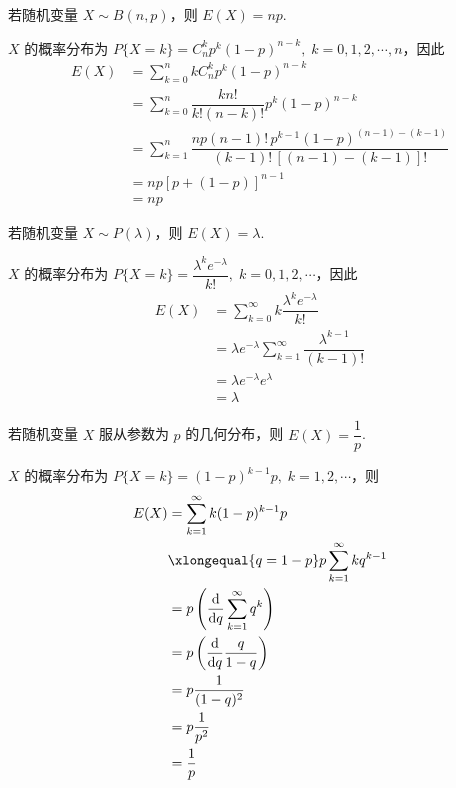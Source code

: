 \begin{conclusion}
    若随机变量 $X \sim B(n,p)$，则 $E(X) = np$.
\end{conclusion}

\begin{myproof}
    $X$ 的概率分布为 $P\{X=k\} = C_n^k p^k (1-p)^{n-k}, \; k=0,1,2,\cdots,n$，因此
    $$
    \begin{aligned}
        E(X) &= \sum_{k=0}^n k C_n^k p^k (1-p)^{n-k} \\
        &= \sum_{k=0}^n \dfrac{kn!}{k! (n-k)!} p^k (1-p)^{n-k} \\
        &= \sum_{k=1}^n \dfrac{np(n-1)! \, p^{k-1} (1-p)^{(n-1)-(k-1)}}{(k-1)! \, [(n-1)-(k-1)]!} \\
        &= np[p+(1-p)]^{n-1} \\
        &= np
    \end{aligned}
    $$
\end{myproof}

\begin{conclusion}
    若随机变量 $X \sim P(\lambda)$，则 $E(X) = \lambda$.
\end{conclusion}

\begin{myproof}
    $X$ 的概率分布为 $P\{X=k\} = \dfrac{\lambda^k e^{-\lambda}}{k!}, \; k=0,1,2,\cdots$，因此
    $$
    \begin{aligned}
        E(X) &= \sum_{k=0}^{\infty} k \dfrac{\lambda^k e^{-\lambda}}{k!} \\
        &= \lambda e^{-\lambda} \sum_{k=1}^{\infty} \dfrac{\lambda^{k-1}}{(k-1)!} \\
        &= \lambda e^{-\lambda} e^{\lambda} \\
        &= \lambda
    \end{aligned}
    $$
\end{myproof}

\begin{conclusion}
    若随机变量 $X$ 服从参数为 $p$ 的几何分布，则 $E(X) = \dfrac{1}{p}$.
\end{conclusion}

\begin{myproof}
    $X$ 的概率分布为 $P\{X=k\} = (1-p)^{k-1} p, \; k=1,2,\cdots$，则
    $$
    \begin{aligned}
        E(X) &= \sum_{k=1}^{\infty} k (1-p)^{k-1} p \\
        & \xlongequal{q=1-p} p \sum_{k=1}^{\infty} k q^{k-1} \\
        &= p \left( \dfrac{\text{d}}{\text{d}q} \sum_{k=1}^{\infty} q^k \right) \\
        &= p \left( \dfrac{\text{d}}{\text{d}q} \dfrac{q}{1-q} \right) \\
        &= p \dfrac{1}{(1-q)^2} \\
        &= p \dfrac{1}{p^2} \\
        &= \dfrac{1}{p}
    \end{aligned}
    $$
\end{myproof}

